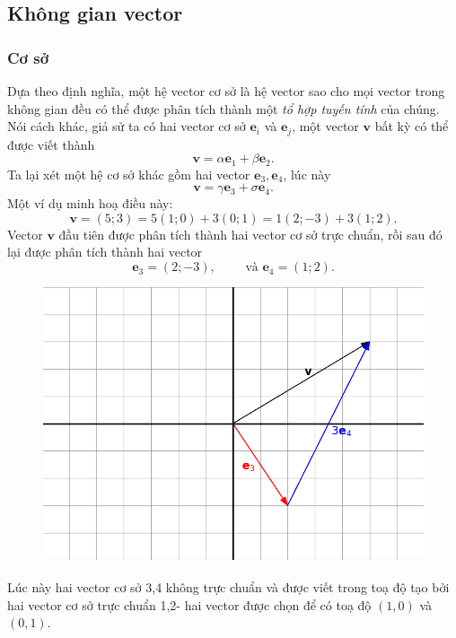 \subsection{Không gian vector}
\subsubsection*{Cơ sở}
Dựa theo định nghĩa, một hệ vector cơ sở là hệ vector sao cho mọi vector trong không gian đều có thể được phân tích thành một \emph{tổ hợp tuyến tính} của chúng. Nói cách khác, giả sử ta có hai vector cơ sở \(\mathbf{e}_i\) và \(\mathbf{e}_j\), một vector \(\mathbf{v}\) bất kỳ có thể được viết thành \[\mathbf{v}=\alpha\mathbf{e}_1 +\beta\mathbf{e}_2.\] Ta lại xét một hệ cơ sở khác gồm hai vector \(\mathbf{e}_{3}, \mathbf{e}_4\), lúc này \[\mathbf{v}=\gamma\mathbf{e}_3 +\sigma\mathbf{e}_4.\]
Một ví dụ  minh hoạ điều này:
\[\mathbf{v}= (5;3)=5(1;0)+3(0;1)=1(2;-3)
+3(1;2).\] Vector \(\mathbf{v}\) đầu tiên được phân tích thành hai vector cơ sở trực chuẩn, rồi sau đó lại được phân tích thành hai vector \[
\mathbf{e}_3 =(2;-3),\qquad \text{ và } \mathbf{e}_4 =(1;2).\] 
\begin{figure}[H]
    \centering
    \includegraphics[width=0.6\linewidth]{Tuan2/Figures/e3e4.png}
\end{figure}
Lúc này hai vector cơ sở 3,4 không trực chuẩn và được viết trong toạ độ tạo bởi hai vector cơ sở trực chuẩn 1,2- hai vector được chọn để có toạ độ \((1,0)\) và \((0,1)\).

